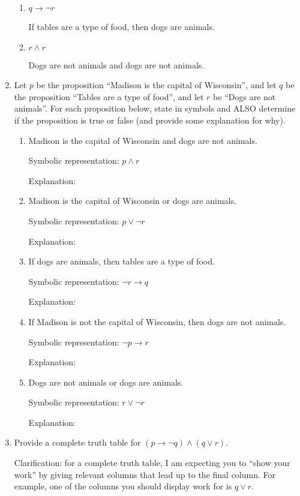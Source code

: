 \documentclass{article}
\begin{document}
\begin{enumerate}
\begin{enumerate}
\item $q \rightarrow \neg r$

If tables are a type of food, then dogs are animals.

\item $r \wedge r$

Dogs are not animals and dogs are not animals.

\end{enumerate}

\item 
Let $p$ be the proposition ``Madison is the capital of Wisconsin'', and let $q$ be the proposition ``Tables are a type of food'', and let $r$ be ``Dogs are not animals''. For each proposition below, state in symbols and ALSO determine if the proposition is true or false (and provide some explanation for why).
\begin{enumerate}
\item Madison is the capital of Wisconsin and dogs are not animals.

Symbolic representation: $p \wedge r$

Explanation:

\item Madison is the capital of Wisconsin or dogs are animals.

Symbolic representation: $p \vee \neg r$

Explanation:

\item If dogs are animals, then tables are a type of food.

Symbolic representation: $\neg r \rightarrow q$

Explanation:

\item If Madison is not the capital of Wisconsin, then dogs are not animals.

Symbolic representation: $\neg p \rightarrow r$

Explanation:

\item Dogs are not animals or dogs are animals.

Symbolic representation: $r \vee \neg r$

Explanation: 

\end{enumerate}

\item Provide a complete truth table for $(p \rightarrow \neg q) \wedge (q \vee r)$.

Clarification: for a complete truth table, I am expecting you to ``show your work'' by giving relevant columns that lead up to the final column. For example, one of the columns you should display work for is $q \vee r$.

\end{enumerate}
\end{document}
